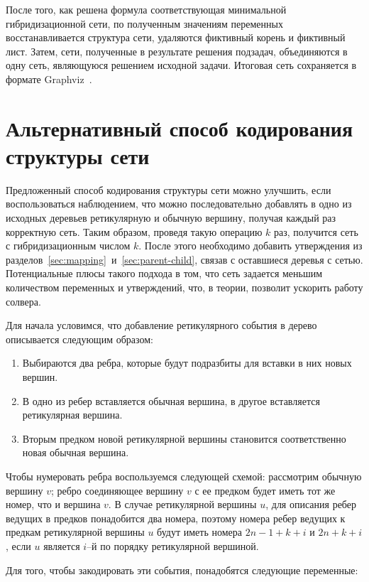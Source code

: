 После того, как решена формула соответствующая минимальной гибридизационной сети, по полученным значениям переменных восстанавливается структура сети, удаляются фиктивный корень и фиктивный лист.
Затем, сети, полученные в результате решения подзадач, объединяются в одну сеть, являющуюся решением исходной задачи.
Итоговая сеть сохраняется в формате Graphviz~\cite{Gansner00anopen}.

\FloatBarrier
\section{Альтернативный способ кодирования структуры сети}

Предложенный способ кодирования структуры сети можно улучшить, если воспользоваться наблюдением, что можно последовательно добавлять в одно из исходных деревьев ретикулярную и обычную вершину, получая каждый раз корректную сеть.
Таким образом, проведя такую операцию $k$ раз, получится сеть с гибридизационным числом $k$.
После этого необходимо добавить утверждения из разделов~\ref{sec:mapping}~и~\ref{sec:parent-child}, связав с оставшиеся деревья с сетью.
Потенциальные плюсы такого подхода в том, что сеть задается меньшим количеством переменных и утверждений, что, в теории, позволит ускорить работу солвера.

Для начала условимся, что добавление ретикулярного события в дерево описывается следующим образом:

\begin{enumerate}
  \item Выбираются два ребра, которые будут подразбиты для вставки в них новых вершин.
  \item В одно из ребер вставляется обычная вершина, в другое вставляется ретикулярная вершина.
  \item Вторым предком новой ретикулярной вершины становится соответственно новая обычная вершина.
\end{enumerate}

Чтобы нумеровать ребра воспользуемся следующей схемой: рассмотрим обычную вершину $v$; ребро соединяющее вершину $v$ с ее предком будет иметь тот же номер, что и вершина $v$.
В случае ретикулярной вершины $u$, для описания ребер ведущих в предков понадобится два номера, поэтому номера ребер ведущих к предкам ретикулярной вершины $u$ будут иметь номера $2n - 1 + k + i$ и $2n + k + i$, если $u$ является $i$--й по порядку ретикулярной вершиной.

Для того, чтобы закодировать эти события, понадобятся следующие переменные:

